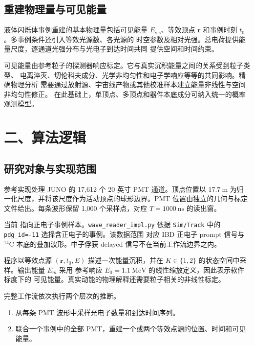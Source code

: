\documentclass[UTF8,a4paper,11pt]{ctexart}
\providecommand{\tightlist}{%
  \setlength{\itemsep}{0pt}\setlength{\parskip}{0pt}}
\begin{document}
\subsection{重建物理量与可见能量}

液体闪烁体事例重建的基本物理量包括可见能量 \(E_{\mathrm{vis}}\)、等效顶点
\(\mathbf r\) 和事例时刻 \(t_0\)。多事例条件还引入等效光源数、各光源的
时空参数及相对光强。总电荷提供能量尺度，逐通道光强分布与光电子到达时间共同
提供空间和时间约束。

可见能量由参考粒子的探测器响应标定。它与真实沉积能量之间的关系受到粒子类型、
电离淬灭、切伦科夫成分、光学非均匀性和电子学响应等等的共同影响。精确物理分析
需要通过放射源、宇宙线产物或其他校准样本建立能量非线性与空间非均匀性修正。
在此基础上，单顶点、多顶点和器件本底成分可纳入统一的概率观测模型。

\section{二、算法逻辑}

\subsection{研究对象与实现范围}

参考实现处理 JUNO 的 17,612 个 20 英寸 PMT 通道。顶点位置以
\(17.7\ \mathrm{m}\) 为归一化尺度，并将该尺度作为活动顶点的球形边界。PMT
位置由独立的几何与标定文件给出。每条波形保留 1,000 个采样点，对应
\(T=1000\ \mathrm{ns}\) 的读出窗。

当前  指向正电子事例样本。\texttt{wave\_reader\_impl.py} 依据
\texttt{Sim/Track} 中的 \texttt{pdg\_id=-11} 选择含正电子的事例。该数据范围
对应 IBD 正电子 prompt 信号与 \(^{14}\mathrm{C}\) 本底的叠加波形。中子俘获
delayed 信号不在当前工作流边界之内。

程序以等效点源 \((\mathbf r,t_0,E)\) 描述一次能量沉积，并在
\(K\in\{1,2\}\) 的状态空间中采样。输出能量 \(E_m\) 采用
参考响应 \(E_0=1.1\ \mathrm{MeV}\) 的线性缩放定义，因此表示软件标度下的
可见能量。真实动能的物理解释还需要粒子相关的非线性标定。

完整工作流依次执行两个层次的推断。

\begin{enumerate}
\def\labelenumi{\arabic{enumi}.}
\tightlist
\item
  从每条 PMT 波形中采样光电子数量和到达时间序列。
\item
  联合一个事例中的全部 PMT，重建一个或两个等效点源的位置、时间和可见能量。
\end{enumerate}
\end{document}

